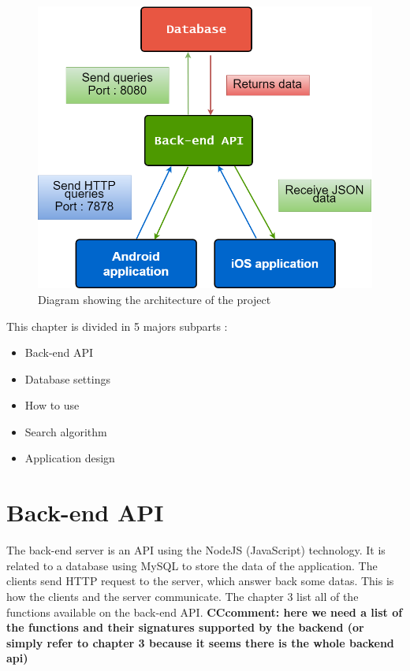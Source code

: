 \begin{figure}[h]
\centering
\includegraphics[scale=0.40]{diagrams/connecting_parts.png}
\caption{Diagram showing the architecture of the project}
\end{figure}

This chapter is divided in 5 majors subparts :
\begin{itemize}
    \item Back-end API
    \item Database settings
    \item How to use
    \item Search algorithm
    \item Application design
\end{itemize}

\section{Back-end API}
The back-end server is an API using the NodeJS (JavaScript) technology. It is related to a database using MySQL to store the data of the application. The clients send HTTP request to the server, which answer back some datas. This is how the clients and the server communicate. The chapter 3 list all of the functions available on the back-end API.
{\bf CCcomment: here we need a list of the functions and their signatures supported by the backend (or simply refer to chapter 3 because it seems there is the whole backend api)}


